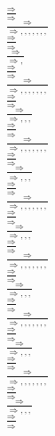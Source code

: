 \documentclass[11pt]{article}
\begin{document}
\begin{center}
\bigskip
\\$\frac{\Rightarrow }{\Rightarrow }$
\bigskip
\\$\frac{\Rightarrow }{\Rightarrow , , , , , , , }$
\bigskip
\\$\frac{\Rightarrow }{\Rightarrow }$
\bigskip
\\$\frac{\Rightarrow }{\Rightarrow , }$
\bigskip
\\$\frac{\Rightarrow }{\Rightarrow }$
\bigskip
\\$\frac{\Rightarrow }{\Rightarrow , , , , , , , }$
\bigskip
\\$\frac{\Rightarrow }{\Rightarrow }$
\bigskip
\\$\frac{\Rightarrow }{\Rightarrow , , , }$
\bigskip
\\$\frac{\Rightarrow }{\Rightarrow }$
\bigskip
\\$\frac{\Rightarrow }{\Rightarrow , , , , , , , }$
\bigskip
\\$\frac{\Rightarrow }{\Rightarrow }$
\bigskip
\\$\frac{\Rightarrow }{\Rightarrow , , , }$
\bigskip
\\$\frac{\Rightarrow }{\Rightarrow }$
\bigskip
\\$\frac{\Rightarrow }{\Rightarrow , , , , , , , }$
\bigskip
\\$\frac{\Rightarrow }{\Rightarrow }$
\bigskip
\\$\frac{\Rightarrow }{\Rightarrow , , , }$
\bigskip
\\$\frac{\Rightarrow }{\Rightarrow }$
\bigskip
\\$\frac{\Rightarrow }{\Rightarrow , , , , , , , }$
\bigskip
\\$\frac{\Rightarrow }{\Rightarrow }$
\bigskip
\\$\frac{\Rightarrow }{\Rightarrow , , , }$
\bigskip
\\$\frac{\Rightarrow }{\Rightarrow }$
\bigskip
\\$\frac{\Rightarrow }{\Rightarrow , , , , , , , }$
\bigskip
\\$\frac{\Rightarrow }{\Rightarrow }$
\bigskip
\\$\frac{\Rightarrow }{\Rightarrow , , , }$
\bigskip
\\$\frac{\Rightarrow }{\Rightarrow }$
\bigskip
\\$\frac{\Rightarrow }{\Rightarrow , , , , , , , }$
\bigskip
\\$\frac{\Rightarrow }{\Rightarrow }$
\bigskip
\\$\frac{\Rightarrow }{\Rightarrow , , , }$
\bigskip
\\$\frac{\Rightarrow }{\Rightarrow }$

\end{center}
\end{document}
